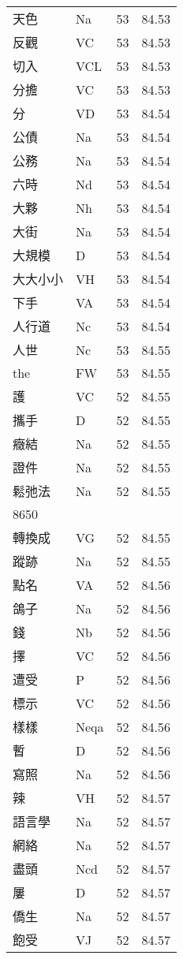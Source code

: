 \documentclass[twocolumn]{book}
\begin{document}
\begin{supertabular}{llrr}
天色 & Na & 53 &  84.53\\
反觀 & VC & 53 &  84.53\\
切入 & VCL & 53 &  84.53\\
分擔 & VC & 53 &  84.53\\
分 & VD & 53 &  84.54\\
公債 & Na & 53 &  84.54\\
公務 & Na & 53 &  84.54\\
六時 & Nd & 53 &  84.54\\
大夥 & Nh & 53 &  84.54\\
大街 & Na & 53 &  84.54\\
大規模 & D & 53 &  84.54\\
大大小小 & VH & 53 &  84.54\\
下手 & VA & 53 &  84.54\\
人行道 & Nc & 53 &  84.54\\
人世 & Nc & 53 &  84.55\\
the & FW & 53 &  84.55\\
護 & VC & 52 &  84.55\\
攜手 & D & 52 &  84.55\\
癥結 & Na & 52 &  84.55\\
證件 & Na & 52 &  84.55\\
鬆弛法 & Na & 52 &  84.55\\
8650\\
轉換成 & VG & 52 &  84.55\\
蹤跡 & Na & 52 &  84.55\\
點名 & VA & 52 &  84.56\\
鴿子 & Na & 52 &  84.56\\
錢 & Nb & 52 &  84.56\\
擇 & VC & 52 &  84.56\\
遭受 & P & 52 &  84.56\\
標示 & VC & 52 &  84.56\\
樣樣 & Neqa & 52 &  84.56\\
暫 & D & 52 &  84.56\\
寫照 & Na & 52 &  84.56\\
辣 & VH & 52 &  84.57\\
語言學 & Na & 52 &  84.57\\
網絡 & Na & 52 &  84.57\\
盡頭 & Ncd & 52 &  84.57\\
屢 & D & 52 &  84.57\\
僑生 & Na & 52 &  84.57\\
飽受 & VJ & 52 &  84.57\\

\end{supertabular}
\end{document}
